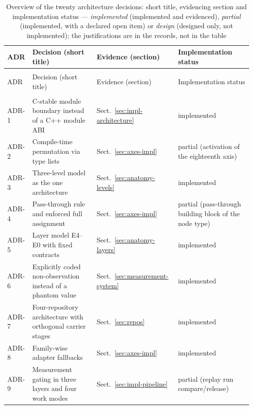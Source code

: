 \begin{footnotesize}
\begin{longtable}{@{}>{\raggedright\arraybackslash}p{1.3cm}>{\raggedright\arraybackslash}p{6.0cm}>{\raggedright\arraybackslash}p{3.3cm}>{\raggedright\arraybackslash}p{3.8cm}@{}}
\caption{Overview of the twenty architecture decisions: short title, evidencing section and
implementation status --- \emph{implemented} (implemented and evidenced), \emph{partial}
(implemented, with a declared open item) or \emph{design} (designed only, not implemented); the
justifications are in the records, not in the table}\label{tab:adr-overview}\\
\toprule
ADR & Decision (short title) & Evidence (section) & Implementation status \\
\midrule
\endfirsthead%
\multicolumn{4}{@{}l}{\tablename\ \thetable{} --- continued}\\
\toprule
ADR & Decision (short title) & Evidence (section) & Implementation status \\
\midrule
\endhead%
\midrule
\multicolumn{4}{@{}r}{\footnotesize continued on the next page}\\
\endfoot%
\bottomrule
\endlastfoot%
ADR-1 & C-stable module boundary instead of a C++ module ABI & Sect.~\ref{sec:impl-architecture} & implemented \\
ADR-2 & Compile-time permutation via type lists & Sect.~\ref{sec:axes-impl} & partial (activation of the eighteenth axis) \\
ADR-3 & Three-level model as the one architecture & Sect.~\ref{sec:anatomy-levels} & implemented \\
ADR-4 & Pass-through rule and enforced full assignment & Sect.~\ref{sec:axes-impl} & partial (pass-through building block of the node type) \\
ADR-5 & Layer model E4--E0 with fixed contracts & Sect.~\ref{sec:anatomy-layers} & implemented \\
ADR-6 & Explicitly coded non-observation instead of a phantom value & Sect.~\ref{sec:measurement-system} & implemented \\
ADR-7 & Four-repository architecture with orthogonal carrier stages & Sect.~\ref{sec:repos} & implemented \\
ADR-8 & Family-wise adapter fallbacks & Sect.~\ref{sec:axes-impl} & implemented \\
ADR-9 & Measurement gating in three layers and four work modes & Sect.~\ref{sec:impl-pipeline} & partial (replay run compare/release) \\

\end{longtable}
\end{footnotesize}
